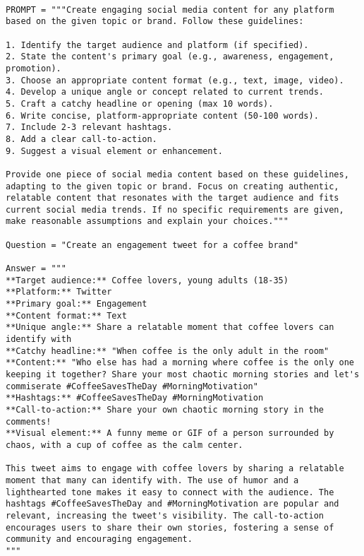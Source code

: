 \begin{tcolorbox}[title={\textbf{\small Performance After Optimization}}, boxrule=2pt, arc=0mm, breakable]
\begin{verbatim}

PROMPT = """Create engaging social media content for any platform based on the given topic or brand. Follow these guidelines:

1. Identify the target audience and platform (if specified).
2. State the content's primary goal (e.g., awareness, engagement, promotion).
3. Choose an appropriate content format (e.g., text, image, video).
4. Develop a unique angle or concept related to current trends.
5. Craft a catchy headline or opening (max 10 words).
6. Write concise, platform-appropriate content (50-100 words).
7. Include 2-3 relevant hashtags.
8. Add a clear call-to-action.
9. Suggest a visual element or enhancement.

Provide one piece of social media content based on these guidelines, adapting to the given topic or brand. Focus on creating authentic, relatable content that resonates with the target audience and fits current social media trends. If no specific requirements are given, make reasonable assumptions and explain your choices."""

Question = "Create an engagement tweet for a coffee brand"

Answer = """
**Target audience:** Coffee lovers, young adults (18-35)
**Platform:** Twitter
**Primary goal:** Engagement
**Content format:** Text
**Unique angle:** Share a relatable moment that coffee lovers can identify with
**Catchy headline:** "When coffee is the only adult in the room"
**Content:** "Who else has had a morning where coffee is the only one keeping it together? Share your most chaotic morning stories and let's commiserate #CoffeeSavesTheDay #MorningMotivation"
**Hashtags:** #CoffeeSavesTheDay #MorningMotivation
**Call-to-action:** Share your own chaotic morning story in the comments!
**Visual element:** A funny meme or GIF of a person surrounded by chaos, with a cup of coffee as the calm center.

This tweet aims to engage with coffee lovers by sharing a relatable moment that many can identify with. The use of humor and a lighthearted tone makes it easy to connect with the audience. The hashtags #CoffeeSavesTheDay and #MorningMotivation are popular and relevant, increasing the tweet's visibility. The call-to-action encourages users to share their own stories, fostering a sense of community and encouraging engagement.
"""

\end{verbatim}
\end{tcolorbox}


